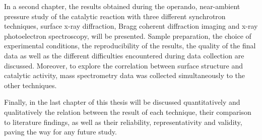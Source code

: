 In a second chapter, the results obtained during the operando, near-ambient pressure study of the catalytic reaction with three different synchrotron techniques, surface x-ray diffraction, Bragg coherent diffraction imaging and x-ray photoelectron spectroscopy, will be presented.
Sample preparation, the choice of experimental conditions, the reproducibility of the results, the quality of the final data as well as the different difficulties encountered during data collection are discussed.
Moreover, to explore the correlation between surface structure and catalytic activity, mass spectrometry data was collected simultaneously to the other techniques.

Finally, in the last chapter of this thesis will be discussed quantitatively and qualitatively the relation between the result of each technique, their comparison to literature findings, as well as their reliability, representativity and validity, paving the way for any future study.